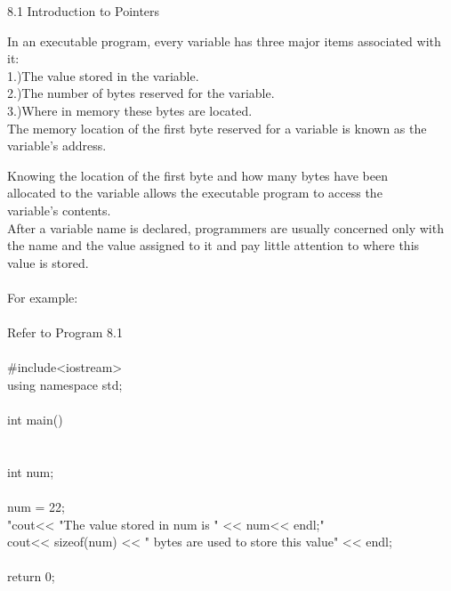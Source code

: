 \documentclass{article}
\begin{document}
\begin{center}
8.1 Introduction to Pointers
\end{center}


In an executable program, every variable has three major items associated with it:\\
1.)The value stored in the variable.\\
2.)The number of bytes reserved for the variable.\\
3.)Where in memory these bytes are located.\\

The memory location of the first byte reserved for a variable is known as the 
variable's address.

Knowing the location of the first byte and how many bytes have been \\
allocated to the variable allows the executable program to access the \\
variable's contents.\\

After a variable name is declared, programmers are usually concerned only with\\the name and the value assigned to it and pay little attention to where this\\
value is stored.\\
\\
For example:\\
\\
Refer to Program 8.1\\
\\
#include<iostream>\\
using namespace std;\\
\\
int main()\\
{\\
\\
int num;\\
\\
num = 22;\\
"cout<< "The value stored in num is " << num<< endl;"\\
cout<< sizeof(num) << " bytes are used to store this value" << endl;\\
\\
return 0;\\
}\\
\\

\end{document}
